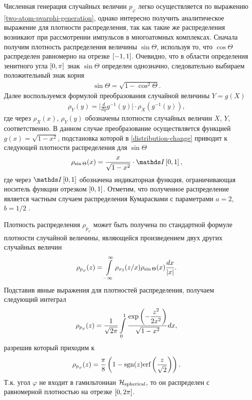 Численная генерация случайных величин $p_\varphi$ легко осуществляется по выражению \eqref{two-atom-pvarphi-generation}, однако интересно получить аналитическое выражение для плотности распределения, так как такие же распределения возникают при рассмотрении импульсов в многоатомных комплексах. Сначала получим плотность распределения величины $\sin \Theta$, используя то, что $\cos \Theta$ распределен равномерно на отрезке $\left[ -1, 1\right]$. Очевидно, что в области определения зенитного угла $\left[ 0, \pi \right]$ знак $\sin \Theta$ определен однозначно, следовательно выбираем положительный знак корня 
\begin{gather}
    \sin \Theta = \sqrt{ 1 - \cos^2 \Theta}.
\end{gather}
Далее воспользуемся формулой преобразования случайной величины $Y = g(X)$
\begin{gather}
    \rho_Y(y) = \Big\vert \frac{d}{dy} g^{-1}(y) \Big\vert \cdot \rho_X(g^{-1}(y)), \label{distribution-change}
\end{gather}
%
где через $\rho_X(x)$, $\rho_Y(y)$ обозначены плотности случайных величин $X$, $Y$, соответственно. В данном случае преобразование осуществляется функцией $g(x) = \sqrt{1 - x^2}$, подстановка которой в \eqref{distribution-change} приводит к следующей плотности распределения для $\sin \Theta$ 
\begin{gather}
    \rho_{\sin \Theta}(x) = \frac{x}{\sqrt{1 - x^2}} \cdot \bbI\lsq 0, 1\rsq,
\end{gather}
% 
где через $\bbI\lsq 0, 1 \rsq$ обозначена индикаторная функция, ограничивающая носитель функции отрезком $\left[ 0, 1 \right]$. Отметим, что полученное распределение является частным случаем распределения Кумарасвами с параметрами $a = 2$, $b = 1/2$ \cite{kumaraswamy1980}. \par
Плотность распределения $\rho_{p_\varphi}$ может быть получена по стандартной формуле плотности случайной величины, являющейся произведением двух других случайных величин
\begin{gather}
    \rho_{p_\varphi}(z) = \int\limits_{-\infty}^\infty \rho_{x_3}(z/x) \rho_{\sin \Theta}(x) \frac{dx}{\vert x \vert}.
\end{gather}
Подставив явные выражения для плотностей распределения, получаем следующий интеграл
\begin{gather}
    \rho_{p_\varphi}(z) = \frac{1}{\sqrt{2 \pi}} \int\limits_0^1 \frac{\displaystyle \exp \left( -\frac{z^2}{2x^2} \right)}{\sqrt{1 - x^2}} dx,
\end{gather}
%
разрешив который приходим к
\begin{gather}
    \rho_{p_\varphi}(z) = \frac{\pi}{8} \left( 1 - \text{sgn}(z) \text{erf} \left( \frac{z}{\sqrt{2}} \right) \right).
\end{gather}
Т.к. угол $\varphi$ не входит в гамильтониан $\mathcal{H}_\text{spherical}$, то он распределен с равномерной плотностью на отрезке $\left[ 0, 2 \pi \right]$.

